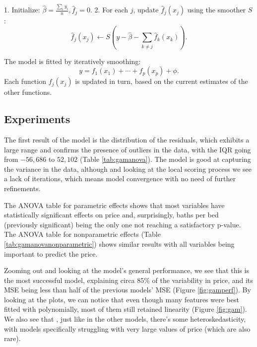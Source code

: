 \documentclass[a4paper, 11pt]{article}
\begin{document}
\begin{multicols}{2}
1. Initialize: \( \hat{\beta} = \frac{\sum_{i} y_i}{n}, \hat{f}_j = 0 \).
2. For each \( j \), update \( \hat{f}_j(x_j) \) using the smoother \( S \):
\begin{equation}
\hat{f}_j(x_j) \leftarrow S \left( y - \hat{\beta} - \sum_{k \neq j} \hat{f}_k(x_k) \right).
\end{equation}

The model is fitted by iteratively smoothing:
\begin{equation}
y = f_1(x_1) + \cdots + f_p(x_p) + \phi.
\end{equation}
Each function \( f_j(x_j) \) is updated in turn, based on the current estimates of the other functions.


\subsection{Experiments}
The first result of the model is the distribution of the residuals, which exhibits a large range and confirms the presence of outliers in the data, with the IQR going from $-56,686$ to $52,102$ (Table \ref{tab:gamanova}). The model is good at capturing the variance in the data, although and looking at the local scoring process we see a lack of iterations, which means model convergence with no need of further refinements.

The ANOVA table for parametric effects shows that most variables have statistically significant effects on price and, surprisingly, baths per bed (previously significant) being the only one not reaching a satisfactory p-value. The ANOVA table for nonparametric effects (Table \ref{tab:gamanovanonparametric}) shows similar results with all variables being important to predict the price.

Zooming out and looking at the model's general performance, we see that this is the most successful model, explaining circa 85\% of the variability in price, and its MSE being less than half of the previous models' MSE (Figure \ref{fig:gamperf}). By looking at the plots, we can notice that even though many features were best fitted with polynomially, most of them still retained linearity (Figure \ref{fig:gam}). We also see that , just like in the other models, there's some heteroskedasticity, with models specifically struggling with very large values of price (which are also rare). 



\end{multicols}
\end{document}
